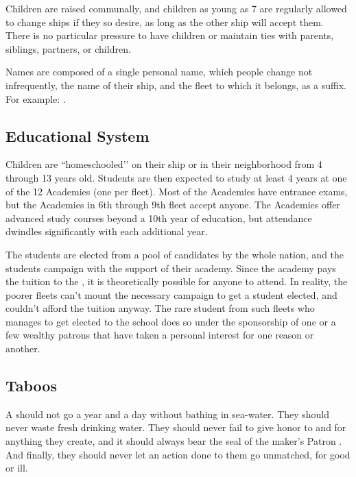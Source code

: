 \documentclass[blue]{GL2020}
\begin{document}
Children are raised communally, and children as young as 7 are regularly allowed to change ships if they so desire, as long as the other ship will accept them. There is no particular pressure to have children or maintain ties with parents, siblings, partners, or children.

Names are composed of a single personal name, which people change not infrequently, the name of their ship, and the fleet to which it belongs, as a suffix. For example: \cLoud{\full}.

\subsection*{Educational System}
Children are ``homeschooled’’ on their ship or in their neighborhood from 4 through 13 years old. Students are then expected to study at least 4 years at one of the 12 Academies (one per fleet). Most of the Academies have entrance exams, but the Academies in 6th through 9th fleet accept anyone. The Academies offer advanced study courses beyond a 10th year of education, but attendance dwindles significantly with each additional year.

The \pShip{} \pSchool{} students are elected from a pool of candidates by the whole nation, and the students campaign with the support of their academy. Since the academy pays the tuition to the \pSc{}, it is theoretically possible for anyone to attend. In reality, the poorer fleets can't mount the necessary campaign to get a student elected, and couldn't afford the tuition anyway. The rare student from such fleets who manages to get elected to the school does so under the sponsorship of one or a few wealthy patrons that have taken a personal interest for one reason or another.

\subsection*{Taboos}
A \pShippie{} should not go a year and a day without bathing in sea-water. They should never waste fresh drinking water. They should never fail to give honor to \cEbb{} and \cFlow{} for anything they create, and it should always bear the seal of the maker's Patron \cEbb{\God}. And finally, they should never let an action done to them go unmatched, for good or ill.
\end{document}
